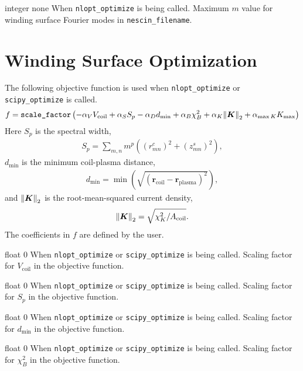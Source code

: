 {integer}
{none}
{When \texttt{nlopt\_optimize} is being called.}
{Maximum $m$ value for winding surface Fourier modes in \texttt{nescin\_filename}.}

\section{Winding Surface Optimization}

The following objective function is used when \texttt{nlopt\_optimize} or \texttt{scipy\_optimize} is called.
\begin{gather}
f = \texttt{scale\_factor} \left( -\alpha_V V_{\text{coil}} + \alpha_S S_p - \alpha_D d_{\text{min}} + \alpha_B \chi^2_B + \alpha_K \norm{\bm{K}}_2 + \alpha_{\max K} K_{\max} \right)
\end{gather}
Here $S_p$ is the spectral width,
\begin{gather}
S_p = \sum_{m,n} m^p \left( \left(r_{mn}^c\right)^2 + \left(z_{mn}^s\right)^2 \right),
\label{spectral_width}
\end{gather}
$d_{\text{min}}$ is the minimum coil-plasma distance,
\begin{gather}
d_{\text{min}} = \min \left( \sqrt{ \left(\bm{r}_{\text{coil}} - \bm{r}_{\text{plasma}} \right)^2 } \right),
\end{gather}
and $\norm{\bm{K}}_2$ is the root-mean-squared current density,
\begin{gather}
\norm{\bm{K}}_2 = \sqrt{\chi^2_K/A_{\text{coil}}}.
\end{gather}
The coefficients in $f$ are defined by the user. 

\myhrule

{float}
{0}
{When \texttt{nlopt\_optimize} or \texttt{scipy\_optimize} is being called.}
{Scaling factor for $V_{\text{coil}}$ in the objective function.}

\myhrule

{float}
{0}
{When \texttt{nlopt\_optimize} or \texttt{scipy\_optimize} is being called.}
{Scaling factor for $S_p$ in the objective function.}

\myhrule

{float}
{0}
{When \texttt{nlopt\_optimize} or \texttt{scipy\_optimize} is being called.}
{Scaling factor for $d_{\text{min}}$ in the objective function.}

\myhrule

{float}
{0}
{When \texttt{nlopt\_optimize} or \texttt{scipy\_optimize} is being called.}
{Scaling factor for $\chi^2_B$ in the objective function.}

